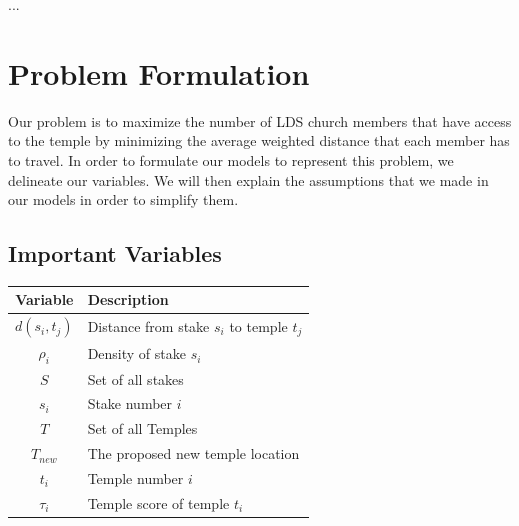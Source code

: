 \documentclass[twoside,twocolumn]{article}
\begin{document}
...

\section{Problem Formulation}
\label{sec:prob}

Our problem is to maximize the number of LDS church members that have access to the temple by minimizing the average weighted distance that each member has to travel.
In order to formulate our models to represent this problem, we delineate our variables.
We will then explain the assumptions that we made in our models in order to simplify them.

\subsection{Important Variables}
\begin{tabular}{c | l}
Variable & Description\\
\hline
$d(s_{i},t_{j})$ & Distance from stake $s_{i}$ to temple $t_{j}$\\
$\rho_{i}$ & Density of stake $s_{i}$\\
$S$ & Set of all stakes\\
$s_{i}$ & Stake number $i$\\
$T$ & Set of all Temples\\
$T_{new}$ & The proposed new temple location\\
$t_{i}$ & Temple number $i$ \\
$\tau_{i}$ & Temple score of temple $t_{i}$\\
\end{tabular}
\vspace{0.1in}

\end{document}

